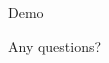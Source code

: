\documentclass{beamer}
\begin{document}
\begin{slide}%

\begin{center}
   Demo
\end{center}

\end{slide}


\begin{slide}%
\end{slide}


\begin{slide}%
\end{slide}





\begin{slide} %

\begin{center}
Any questions?
\end{center}

\end{slide}
\end{document}

